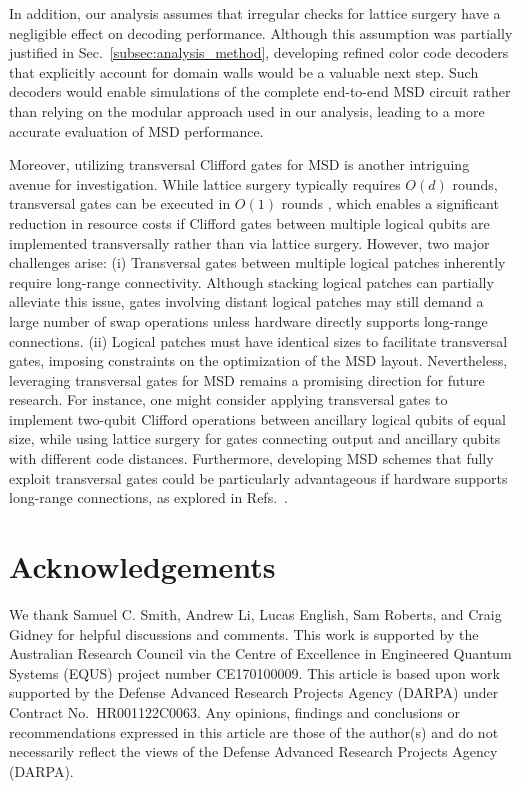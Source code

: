 \documentclass[
 prx,
 reprint,
 superscriptaddress,
 longbibliography,
 dvipsnames
]{revtex4-2}
\begin{document}
\label{para:in_addition_our}
In addition, our analysis assumes that irregular checks for lattice surgery have a negligible effect on decoding performance.
Although this assumption was partially justified in Sec.~\ref{subsec:analysis_method}, developing refined color code decoders that explicitly account for domain walls would be a valuable next step. 
Such decoders would enable simulations of the complete end-to-end MSD circuit rather than relying on the modular approach used in our analysis, leading to a more accurate evaluation of MSD performance.

\label{para:moreover_utilizing}
Moreover, utilizing transversal Clifford gates for MSD is another intriguing avenue for investigation.
While lattice surgery typically requires $O(d)$ rounds, transversal gates can be executed in $O(1)$ rounds \cite{zhou2024algorithmic}, which enables a significant reduction in resource costs if Clifford gates between multiple logical qubits are implemented transversally rather than via lattice surgery.
However, two major challenges arise:
(i) Transversal gates between multiple logical patches inherently require long-range connectivity. 
Although stacking logical patches can partially alleviate this issue, gates involving distant logical patches may still demand a large number of swap operations unless hardware directly supports long-range connections.
(ii) Logical patches must have identical sizes to facilitate transversal gates, imposing constraints on the optimization of the MSD layout.
Nevertheless, leveraging transversal gates for MSD remains a promising direction for future research.
For instance, one might consider applying transversal gates to implement two-qubit Clifford operations between ancillary logical qubits of equal size, while using lattice surgery for gates connecting output and ancillary qubits with different code distances.
Furthermore, developing MSD schemes that fully exploit transversal gates could be particularly advantageous if hardware supports long-range connections, as explored in Refs.~\cite{zhou2024algorithmic,fazio2025low}.

\section*{Acknowledgements}

We thank Samuel C. Smith, Andrew Li, Lucas English, Sam Roberts, and Craig Gidney for helpful discussions and comments. 
This work is supported by the Australian Research Council via the Centre of Excellence in Engineered Quantum Systems (EQUS) project number CE170100009.  This article is based upon work supported by the Defense Advanced Research Projects Agency (DARPA) under Contract No.\ HR001122C0063. Any opinions, findings and conclusions or recommendations expressed in this article are those of the author(s) and do not necessarily reflect the views of the Defense Advanced Research Projects Agency (DARPA).
\end{document}
